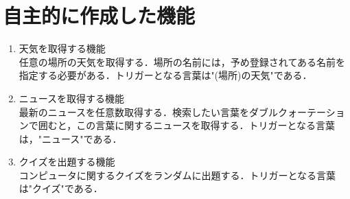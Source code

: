 \documentclass[12pt]{jsarticle}
\begin{document}
\section{自主的に作成した機能}
\begin{enumerate}
\item 天気を取得する機能\\
	任意の場所の天気を取得する．場所の名前には，予め登録されてある名前を指定する必要がある．トリガーとなる言葉は"(場所)の天気"である．
\item ニュースを取得する機能\\
最新のニュースを任意数取得する．検索したい言葉をダブルクォーテーションで囲むと，この言葉に関するニュースを取得する．トリガーとなる言葉は，"ニュース"である．
\item クイズを出題する機能\\
コンピュータに関するクイズをランダムに出題する．トリガーとなる言葉は"クイズ"である．
\end{enumerate}



\end{document}
